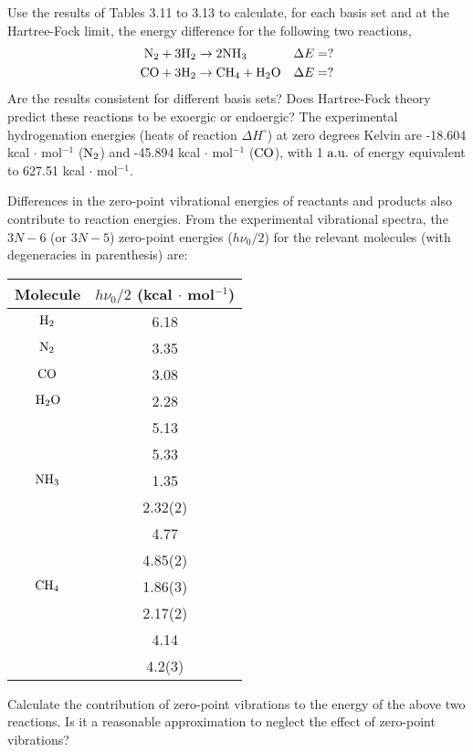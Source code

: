 \documentclass[a4paper]{book}
\newcounter{exercise}[chapter]
\newcommand{\au}{{\rm a.u.}}
\begin{document}
	\begin{exercise}
	Use the results of Tables 3.11 to 3.13 to calculate, for each basis set and at the Hartree-Fock limit, the energy difference for the following two reactions,
	\begin{align*}
		\ce{N2} + 3 \ce{H2} &\rightarrow 2 \ce{NH3} & & \Delta E = ? \\
		\ce{CO} + 3 \ce{H2} &\rightarrow \ce{CH4} + \ce{H2O} &  & \Delta E = ?
	\end{align*}
	Are the results consistent for different basis sets? Does Hartree-Fock theory predict these reactions to be exoergic or endoergic? The experimental hydrogenation energies (heats of reaction $\Delta H^\circ$) at zero degrees Kelvin are -18.604 kcal $\cdot$ mol${}^{-1}$ ($\ce{N2}$) and -45.894 kcal $\cdot$ mol${}^{-1}$ ($\ce{CO}$), with 1 $\au$ of energy equivalent to 627.51 kcal $\cdot$ mol${}^{-1}$.
	
	Differences in the zero-point vibrational energies of reactants and products also contribute to reaction energies. From the experimental vibrational spectra, the $3N-6$ (or $3N-5$) zero-point energies ($h\nu_0/2$) for the relevant molecules (with degeneracies in parenthesis) are:
	\begin{center}
	\begin{tabular}{cc} \hline
	Molecule & $h\nu_0/2$ (kcal $\cdot$ mol${}^{-1}$) \\ \hline
	$\ce{H2}$ & 6.18 \\
	$\ce{N2}$ & 3.35 \\
	$\ce{CO}$ & 3.08 \\
	$\ce{H2O}$ & 2.28 \\
			& 5.13 \\
			& 5.33 \\
	$\ce{NH3}$ & 1.35 \\
			& 2.32(2) \\
			& 4.77 \\
			& 4.85(2) \\
	$\ce{CH4}$ & 1.86(3) \\
			& 2.17(2) \\
			& 4.14 \\
			& 4.2(3) \\ \hline
	\end{tabular}
	\end{center}
	Calculate the contribution of zero-point vibrations to the energy of the above two reactions. Is it a reasonable approximation to neglect the effect of zero-point vibrations?
	\end{exercise}
	
\end{document}
